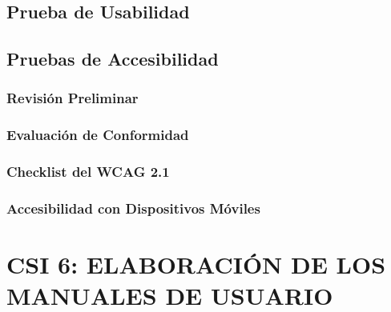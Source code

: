\subsection{Prueba de Usabilidad}

\subsection{Pruebas de Accesibilidad} 
 
\subsubsection{Revisión Preliminar} 

\subsubsection{Evaluación de Conformidad} 

\subsubsection{Checklist del WCAG 2.1} 

\subsubsection{Accesibilidad con Dispositivos Móviles} 


\newpage
\section{CSI 6: ELABORACIÓN DE LOS MANUALES DE USUARIO}


